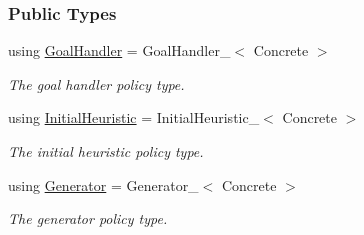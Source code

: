 \subsubsection*{Public Types}
\begin{DoxyCompactItemize}
\item 
using \hyperlink{structAlgorithm_a915f86cad5585ba0adb63d017c7afdb2}{Goal\+Handler} = Goal\+Handler\+\_\+$<$ Concrete $>$\hypertarget{structAlgorithm_a915f86cad5585ba0adb63d017c7afdb2}{}\label{structAlgorithm_a915f86cad5585ba0adb63d017c7afdb2}

\begin{DoxyCompactList}\small\item\em The goal handler policy type. \end{DoxyCompactList}\item 
using \hyperlink{structAlgorithm_a01a7b5d204e82e4aed951680a38013a5}{Initial\+Heuristic} = Initial\+Heuristic\+\_\+$<$ Concrete $>$\hypertarget{structAlgorithm_a01a7b5d204e82e4aed951680a38013a5}{}\label{structAlgorithm_a01a7b5d204e82e4aed951680a38013a5}

\begin{DoxyCompactList}\small\item\em The initial heuristic policy type. \end{DoxyCompactList}\item 
using \hyperlink{structAlgorithm_ae48d359026f66d7f6c0d15d964a0e8bd}{Generator} = Generator\+\_\+$<$ Concrete $>$\hypertarget{structAlgorithm_ae48d359026f66d7f6c0d15d964a0e8bd}{}\label{structAlgorithm_ae48d359026f66d7f6c0d15d964a0e8bd}

\begin{DoxyCompactList}\small\item\em The generator policy type. \end{DoxyCompactList}\end{DoxyCompactItemize}
